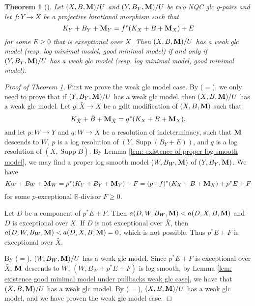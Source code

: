 \documentclass[11pt]{amsart}
\numberwithin{equation}{section}
\newcommand{\Mm}{{\bf{M}}}
\newcommand{\Rr}{\mathbb{R}}
\newcommand{\Supp}{\operatorname{Supp}}
\newtheorem{thm}{Theorem}[section]
\theoremstyle{definition}
\theoremstyle{definition}
\theoremstyle{definition}
\begin{document}
\begin{thm}[{\cite[Version 3, Theorem 3.14]{HL21}}]\label{thm: existence good minimal model under pullbacks}
Let $(X,B,\Mm)/U$ and $(Y,B_Y,\Mm)/U$ be two NQC glc g-pairs and let $f: Y\rightarrow X$ be a projective birational morphism such that
$$K_Y+B_Y+\Mm_Y=f^*(K_X+B+\Mm_X)+E$$
for some $E\geq 0$ that is exceptional over $X$. Then $(X,B,\Mm)/U$ has a weak glc model (resp. log minimal model, good minimal model) if and only if $(Y,B_Y,\Mm)/U$ has a weak glc model (resp. log minimal model, good minimal model).
\end{thm}
\begin{proof}[Proof of Theorem \ref{thm: existence good minimal model under pullbacks}]
First we prove the weak glc model case. By \cite[Lemma 3.10(1)]{HL21} ($=$\cite[Version 3, Lemma 3.17]{HL21}), we only need to prove that if $(Y,B_Y,\Mm)/U$ has a weak glc model, then $(X,B,\Mm)/U$ has a weak glc model. Let $g: \bar X\rightarrow X$ be a gdlt modification of $(X,B,\Mm)$ such that
$$K_{\bar X}+\bar B+\Mm_{\bar X}=g^*(K_X+B+\Mm_X),$$
and let $p: W\rightarrow Y$ and $q: W\rightarrow\bar X$ be a resolution of indeterminacy, such that $\Mm$ descends to $W$, $p$ is a log resolution of $(Y,\Supp(B_Y+E))$, and $q$ is a log resolution of $(\bar X,\Supp\bar B)$.  By Lemma \ref{lem: existence of proper log smooth model}, we may find a proper log smooth model $(W,B_W,\Mm)$ of $(Y,B_Y,\Mm)$. We have
$$K_W+B_W+\Mm_W=p^*(K_Y+B_Y+\Mm_Y)+F=(p\circ f)^*(K_X+B+\Mm_X)+p^*E+F$$
for some $p$-exceptional $\Rr$-divisor $F\geq 0$.

Let $D$ be a component of $p^*E+F$. Then $a(D,W,B_W,\Mm)<a(D,X,B,\Mm)$ and $D$ is exceptional over $X$. If $D$ is not exceptional over $\bar X$, then $a(D,W,B_W,\Mm)<a(D,X,B,\Mm)=0$, which is not possible. Thus $p^*E+F$ is exceptional over $\bar X$. 

By \cite[Lemma 3.10(1)]{HL21} ($=$\cite[Version 3, Lemma 3.17]{HL21}), $(W,B_W,\Mm)/U$ has a weak glc model. Since $p^*E+F$ is exceptional over $\bar X$, $\Mm$ descends to $W$, $(W,B_W+p^*E+F)$ is log smooth, by Lemma \ref{lem: existence good minimal model under pullbacks weak glc case}, we have that $(\bar X,\bar B,\Mm)/U$ has a weak glc model. By \cite[Lemma 3.11]{HL21} ($=$\cite[Version 3, Lemma 3.13]{HL21}), $(X,B,\Mm)/U$ has a weak glc model, and we have proven the weak glc model case.


\end{proof}
\end{document}
